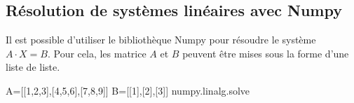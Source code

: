 \documentclass[10pt]{article}
\newif\ifprof
\begin{document}
\begin{py}
\ifprof
\begin{python}
def resolution(AA, BB):
    """Résolution de AA.X=BB; AA doit etre inversible"""
    A, B = AA.copy(), BB.copy()
    n = len(A)
    assert len(A[0]) == n
    # Mise sous forme triangulaire
    for i in range(n):
        j = recherche_pivot(A, i)
        if j > i:
            echange_lignes(A, i, j)
            echange_lignes(B, i, j)
        for k in range(i+1, n):
            mu = - A[k][i] / A[i][i]
            transvection_ligne(A, k, i, mu)
            transvection_ligne(B, k, i, mu)
    # Phase de remontée
    return remontee(A,B)
\end{python}
\else
\vspace{10cm}
\fi

\end{py}
%
%


\subsection{Résolution de systèmes linéaires avec Numpy}
Il est possible d'utiliser le bibliothèque Numpy pour résoudre le système $A\cdot X = B$. 
Pour cela, les matrice $A$ et $B$ peuvent être mises sous la forme d'une liste de liste. 

\begin{py}
\begin{python}
A=[[1,2,3],[4,5,6],[7,8,9]]
B=[[1],[2],[3]]
numpy.linalg.solve
\end{python}
\end{py}

\begin{thebibliography}{2}
\end{thebibliography}
\end{document}
